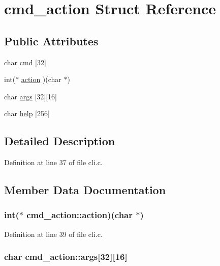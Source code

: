 \hypertarget{structcmd__action}{\section{cmd\-\_\-action Struct Reference}
\label{structcmd__action}
}
\subsection*{Public Attributes}
\begin{DoxyCompactItemize}
\item 
char \hyperlink{structcmd__action_a35a18d029cdcc1a21d74f5a6eadd95a9}{cmd} \mbox{[}32\mbox{]}
\item 
int($\ast$ \hyperlink{structcmd__action_ab84e60b55467e9abf0aa0c523a5c735d}{action} )(char $\ast$)
\item 
char \hyperlink{structcmd__action_a9b98733d18fba095c111b72a7962dcbe}{args} \mbox{[}32\mbox{]}\mbox{[}16\mbox{]}
\item 
char \hyperlink{structcmd__action_a426f4bdd272623577e9a5e8cafa85656}{help} \mbox{[}256\mbox{]}
\end{DoxyCompactItemize}


\subsection{Detailed Description}


Definition at line 37 of file cli.\-c.



\subsection{Member Data Documentation}
\hypertarget{structcmd__action_ab84e60b55467e9abf0aa0c523a5c735d}{
\subsubsection[{action}]{\setlength{\rightskip}{0pt plus 5cm}int($\ast$ cmd\-\_\-action\-::action)(char $\ast$)}}\label{structcmd__action_ab84e60b55467e9abf0aa0c523a5c735d}


Definition at line 39 of file cli.\-c.

\hypertarget{structcmd__action_a9b98733d18fba095c111b72a7962dcbe}{
\subsubsection[{args}]{\setlength{\rightskip}{0pt plus 5cm}char cmd\-\_\-action\-::args\mbox{[}32\mbox{]}\mbox{[}16\mbox{]}}}\label{structcmd__action_a9b98733d18fba095c111b72a7962dcbe}


